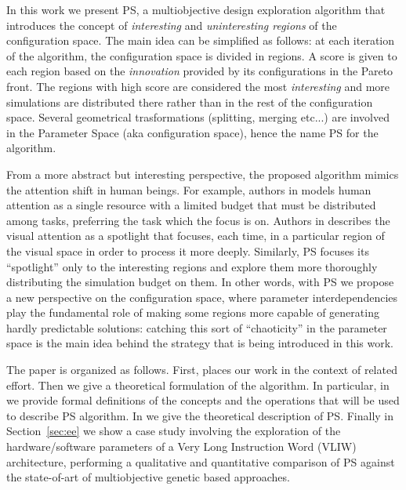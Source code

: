 In this work we present PS, a multiobjective design exploration
algorithm that introduces the concept of \emph{interesting} and
\emph{uninteresting regions} of the configuration space.  The main
idea can be simplified as follows: at each iteration of the algorithm,
the configuration space is divided in regions. A score is given to
each region based on the \emph{innovation} provided by its
configurations in the Pareto front. The regions with high score are
considered the most \emph{interesting} and more simulations are
distributed there rather than in the rest of the configuration space.
Several geometrical trasformations (splitting, merging etc...) are
involved in the Parameter Space (aka configuration space), hence
the name PS for the algorithm.

From a more abstract but interesting perspective, the proposed
algorithm mimics the attention shift in human beings. For example,
authors in \cite{attention} models human attention as a single
resource with a limited budget that must be distributed among tasks,
preferring the task which the focus is on.  Authors in
\cite{spatial_attention} describes the visual attention as a spotlight
that focuses, each time, in a particular region of the visual space in
order to process it more deeply. Similarly, PS focuses its
``spotlight'' only to the interesting regions and explore them more
thoroughly distributing the simulation budget on them.
In other words, with PS we propose a new perspective on the configuration space,
where parameter interdependencies play the fundamental role of making
some regions more capable of generating hardly predictable solutions:
catching this sort of ``chaoticity'' in the parameter space is the
main idea behind the strategy that is being introduced in this work.


The paper is organized as follows. First,  places our work in the context of related effort.
Then we give a theoretical formulation of the algorithm. In particular, in  we provide formal definitions of the concepts and the operations that will be used to describe PS algorithm. In  we give the theoretical description of PS. 
Finally in Section~\ref{sec:ee} we show a case
study involving the exploration of the hardware/software parameters of
a Very Long Instruction Word (VLIW) architecture, performing a
qualitative and quantitative comparison of PS against the state-of-art
of multiobjective genetic based approaches.


